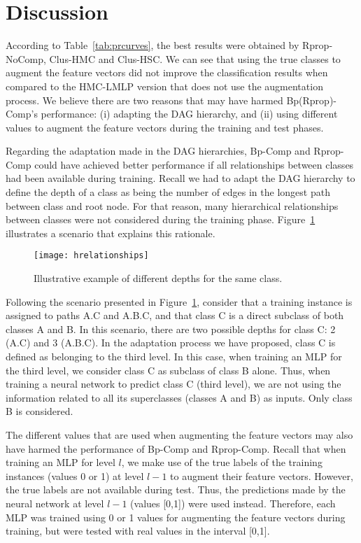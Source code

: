 \section{Discussion}\label{sec:discussion}

According to Table~\ref{tab:prcurves}, the best results were obtained by Rprop-NoComp, Clus-HMC and Clus-HSC. We can see that using the true classes to augment the feature vectors did not improve the classification results when compared to the HMC-LMLP version that does not use the augmentation process. We believe there are two reasons that may have harmed Bp(Rprop)-Comp's performance: (i) adapting the DAG hierarchy, and (ii) using different values to augment the feature vectors during the training and test phases.

Regarding the adaptation made in the DAG hierarchies, Bp-Comp and Rprop-Comp could have achieved better performance if all relationships between classes had been available during training. Recall we had to adapt the DAG hierarchy to define the depth of a class as being the number of edges in the longest path between class and root node. For that reason, many hierarchical relationships between classes were not considered during the training phase. Figure~\ref{fig:hrelationships} illustrates a scenario that explains this rationale.

\begin{figure}[htbp]
       \centering
       \texttt{[image: hrelationships]}
       \caption{Illustrative example of different depths for the same class.}
       \label{fig:hrelationships}
\end{figure}

Following the scenario presented in Figure~\ref{fig:hrelationships}, consider that a training instance is assigned to paths A.C and A.B.C, and that class C is a direct subclass of both classes A and B. In this scenario, there are two possible depths for class C: 2 (A.C) and 3 (A.B.C). In the adaptation process we have proposed, class C is defined as belonging to the third level. In this case, when training an MLP for the third level, we consider class C as subclass of class B alone. Thus, when training a neural network to predict class C (third level), we are not using the information related to all its superclasses (classes A and B) as inputs. Only class B is considered.

The different values that are used when augmenting the feature vectors may also have harmed the performance of Bp-Comp and Rprop-Comp. Recall that when training an MLP for level $l$, we make use of the true labels of the training instances (values 0 or 1) at level $l-1$ to augment their feature vectors. However, the true labels are not available during test. Thus, the predictions made by the neural network at level $l-1$ (values [0,1]) were used instead. Therefore, each MLP was trained using 0 or 1 values for augmenting the feature vectors during training, but were tested with real values in the interval [0,1].

